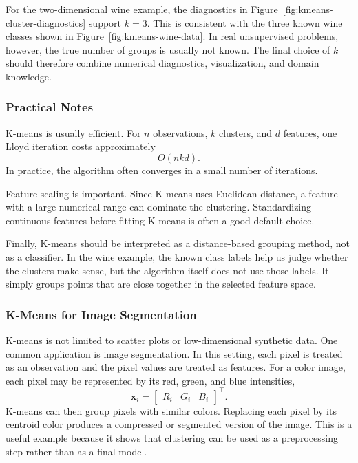 \documentclass[12pt,letter]{article}
\begin{document}
For the two-dimensional wine example, the diagnostics in Figure~\ref{fig:kmeans-cluster-diagnostics} support \(k=3\). This is consistent with the three known wine classes shown in Figure~\ref{fig:kmeans-wine-data}. In real unsupervised problems, however, the true number of groups is usually not known. The final choice of \(k\) should therefore combine numerical diagnostics, visualization, and domain knowledge.

\subsubsection{Practical Notes}

K-means is usually efficient. For \(n\) observations, \(k\) clusters, and \(d\) features, one Lloyd iteration costs approximately
\begin{equation}
    O(nkd).
\end{equation}
In practice, the algorithm often converges in a small number of iterations.

Feature scaling is important. Since K-means uses Euclidean distance, a feature with a large numerical range can dominate the clustering. Standardizing continuous features before fitting K-means is often a good default choice.

Finally, K-means should be interpreted as a distance-based grouping method, not as a classifier. In the wine example, the known class labels help us judge whether the clusters make sense, but the algorithm itself does not use those labels. It simply groups points that are close together in the selected feature space.

\subsubsection{K-Means for Image Segmentation}

K-means is not limited to scatter plots or low-dimensional synthetic data. One common application is image segmentation. In this setting, each pixel is treated as an observation and the pixel values are treated as features. For a color image, each pixel may be represented by its red, green, and blue intensities,
\begin{equation}
    \mathbf{x}_i = \begin{bmatrix} R_i & G_i & B_i \end{bmatrix}^\top.
\end{equation}
K-means can then group pixels with similar colors. Replacing each pixel by its centroid color produces a compressed or segmented version of the image. This is a useful example because it shows that clustering can be used as a preprocessing step rather than as a final model.
\end{document}
